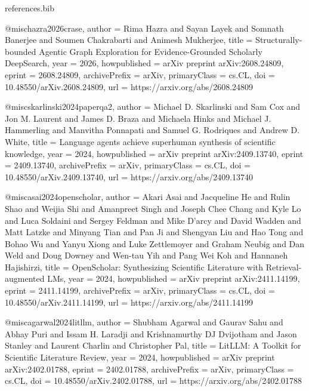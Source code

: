 \begin{filecontents*}{references.bib}

@misc{hazra2026crase,
  author        = {Rima Hazra and Sayan Layek and Somnath Banerjee and Soumen Chakrabarti and Animesh Mukherjee},
  title         = {{Structurally-bounded Agentic Graph Exploration for Evidence-Grounded Scholarly DeepSearch}},
  year          = {2026},
  howpublished  = {arXiv preprint arXiv:2608.24809},
  eprint        = {2608.24809},
  archivePrefix = {arXiv},
  primaryClass  = {cs.CL},
  doi           = {10.48550/arXiv.2608.24809},
  url           = {https://arxiv.org/abs/2608.24809}
}

@misc{skarlinski2024paperqa2,
  author        = {Michael D. Skarlinski and Sam Cox and Jon M. Laurent and James D. Braza and Michaela Hinks and Michael J. Hammerling and Manvitha Ponnapati and Samuel G. Rodriques and Andrew D. White},
  title         = {{Language agents achieve superhuman synthesis of scientific knowledge}},
  year          = {2024},
  howpublished  = {arXiv preprint arXiv:2409.13740},
  eprint        = {2409.13740},
  archivePrefix = {arXiv},
  primaryClass  = {cs.CL},
  doi           = {10.48550/arXiv.2409.13740},
  url           = {https://arxiv.org/abs/2409.13740}
}

@misc{asai2024openscholar,
  author        = {Akari Asai and Jacqueline He and Rulin Shao and Weijia Shi and Amanpreet Singh and Joseph Chee Chang and Kyle Lo and Luca Soldaini and Sergey Feldman and Mike D'arcy and David Wadden and Matt Latzke and Minyang Tian and Pan Ji and Shengyan Liu and Hao Tong and Bohao Wu and Yanyu Xiong and Luke Zettlemoyer and Graham Neubig and Dan Weld and Doug Downey and Wen-tau Yih and Pang Wei Koh and Hannaneh Hajishirzi},
  title         = {{OpenScholar: Synthesizing Scientific Literature with Retrieval-augmented LMs}},
  year          = {2024},
  howpublished  = {arXiv preprint arXiv:2411.14199},
  eprint        = {2411.14199},
  archivePrefix = {arXiv},
  primaryClass  = {cs.CL},
  doi           = {10.48550/arXiv.2411.14199},
  url           = {https://arxiv.org/abs/2411.14199}
}

@misc{agarwal2024litllm,
  author        = {Shubham Agarwal and Gaurav Sahu and Abhay Puri and Issam H. Laradji and Krishnamurthy DJ Dvijotham and Jason Stanley and Laurent Charlin and Christopher Pal},
  title         = {{LitLLM: A Toolkit for Scientific Literature Review}},
  year          = {2024},
  howpublished  = {arXiv preprint arXiv:2402.01788},
  eprint        = {2402.01788},
  archivePrefix = {arXiv},
  primaryClass  = {cs.CL},
  doi           = {10.48550/arXiv.2402.01788},
  url           = {https://arxiv.org/abs/2402.01788}
}


\end{filecontents*}
